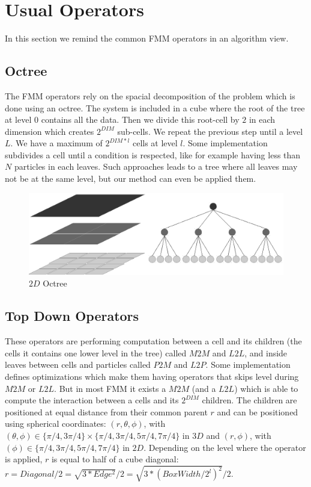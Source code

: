 \documentclass[12pt]{article} %
\begin{document}
\section{Usual Operators}
In this section we remind the common FMM operators in an algorithm view.

\subsection{Octree}
The FMM operators rely on the spacial decomposition of the problem which is done using an octree.
The system is included in a cube where the root of the tree at level $0$ contains all the data.
Then we divide this root-cell by $2$ in each dimension which creates $2^{DIM}$ sub-cells.
We repeat the previous step until a level $L$. We have a maximum of $2^{DIM*l}$ cells at level $l$.
Some implementation subdivides a cell until a condition is respected, like for example having less than $N$ particles in each leaves.
Such approaches leads to a tree where all leaves may not be at the same level, but our method can even be applied them.

\begin{figure}[h]
\centering
\includegraphics[scale=0.6]{Images/Octree}
\caption{$2D$ Octree}
\end{figure}

\subsection{Top Down Operators}
These operators are performing computation between a cell and its children (the cells it contains one lower level in the tree) called $M2M$ and $L2L$,
and inside leaves between cells and particles called $P2M$ and $L2P$.
Some implementation defines optimizations which make them having operators that skips level during $M2M$ or $L2L$.
But in most FMM it exists a $M2M$ (and a $L2L$) which is able to compute the interaction between a cells and its $2^{DIM}$ children.
The children are positioned at equal distance from their common parent $r$ and can be positioned using spherical coordinates:
$(r,\theta,\phi)$, with $(\theta,\phi) \in \{\pi/4,3\pi/4\} \times \{\pi/4, 3\pi/4, 5\pi/4, 7\pi/4\}$ in $3D$ and
$(r,\phi)$, with $(\phi) \in \{\pi/4, 3\pi/4, 5\pi/4, 7\pi/4\}$ in $2D$.
Depending on the level where the operator is applied, $r$ is equal to half of a cube diagonal:
$r = Diagonal/2 = \sqrt{ 3 * Edge^2 }/2 = \sqrt{ 3 * (BoxWidth/2^{l})^2 }/2$.
\end{document}
